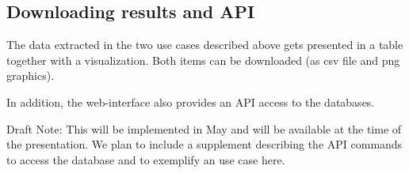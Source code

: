 \subsection{Downloading results and API}

The data extracted in the two use cases described above gets presented in a table together with a visualization. Both items can be downloaded (as csv file and png graphics).

In addition, the web-interface also provides an API access to the databases. 

Draft Note: This will be implemented in May and will be available at the time of the presentation. We plan to include a supplement describing the API commands to access the database and to exemplify  an use case here.

